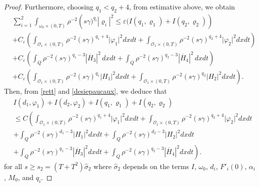 \documentclass[11pt,a4paper]{amsart}
\numberwithin{equation}{section}
\begin{document}
\begin{proof}
\noindent Furthermore, choosing $q_{1}<q_{2}+4$, from estimative above, we obtain
\begin{equation}\label{desiepaucaux}
    \begin{split}
       & \sum_{i=1}^{2}\int_{\omega_0\times (0,T)} \rho^{-2} \left( s \gamma)^{q_i} |\varrho_i|^2 \leq  \varepsilon  (I(q_1,\varrho_1) +  I(q_2,\varrho_2)\right) \\
	& + C_{\varepsilon} \left(\int_{\mathcal{O}_1\times (0,T)}\rho^{-2}(s\gamma)^{q_1+4}\vert \varphi_1 \vert^2dxdt+\int_{\mathcal{O}_1\times (0,T)}\rho^{-2}(s\gamma)^{q_2+4}\vert \varphi_2 \vert^2dxdt\right)\\
	&
	+ C_{\varepsilon}\left( \int_{Q}\rho^{-2}(s\gamma)^{q_{1}-3}|\overline{H}_{3}|^{2}\,dxdt+\int_{Q}\rho^{-2}(s\gamma)^{q_{2}-3}|\overline{H}_{4}|^{2}\,dxdt  \right)   \\
	& + C_{\varepsilon}\left(\int_{\mathcal{O}_1\times (0,T)}\rho^{-2}(s\gamma)^{q_1}\vert H_1\vert^2dxdt+\int_{\mathcal{O}_1\times (0,T)}\rho^{-2}(s\gamma)^{q_2}\vert H_2\vert^2dxdt\right). 
    \end{split}
\end{equation}Then, from \eqref{rett} and \eqref{desiepaucaux}, we deduce that
\begin{equation}\label{rett_22}
\begin{split}
  &I(d_1,\varphi_1) +I(d_2,\varphi_2)+I(q_1,\varrho_1)+I(q_2,\varrho_2)\\
    &\leq C\left( \int_{\mathcal{O}_1\times (0,T)}\rho^{-2}(s\gamma)^{q_1+4}\vert \varphi_1 \vert^2dxdt+\int_{\mathcal{O}_1\times (0,T)}\rho^{-2}(s\gamma)^{q_2+4}\vert \varphi_2 \vert^2dxdt      \right.\\
  &+\int_Q\rho^{-2}(s\gamma)^{d_1-3} \vert H_1\vert^2  dxdt +\int_Q\rho^{-2}(s\gamma)^{d_2-3} \vert H_2\vert^2  dxdt \\
  &\left. +\int_Q\rho^{-2}(s\gamma)^{q_1-3} |\overline{H}_3|^2  dxdt +\int_Q\rho^{-2}(s\gamma)^{q_2-3} |\overline{H}_4|^2  dxdt \right).  
\end{split}
\end{equation}for all $s\geq s_2 = (T+T^2)\hat{\sigma}_{2}$ where $\hat{\sigma}_{2}$ depends on the terms $I$, $\omega_0$, $d_i$,  $F'_{i}(0)$,  $\alpha_{i}$, $M_{0}$,  and  $q_i$.




\end{proof}
\end{document}
